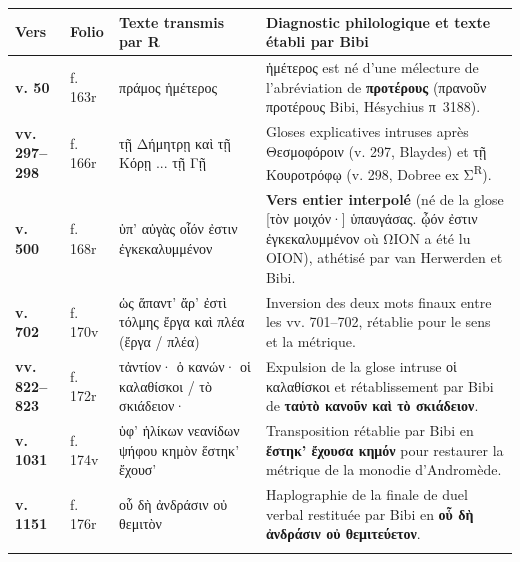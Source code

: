 \documentclass[11pt, a4paper, twoside]{article}
\renewcommand{\_}{\origunderscore\penalty0\relax}
\renewcommand{\texttt}[1]{#1}
\newcommand{\R}{\textbf{R}}
\newcommand{\Bibi}{\textit{Bibi}}
\def\R{R}%
\def\Bibi{Bibi}%
\begin{document}
{\small
\begin{longtable}{@{}>{\raggedright\arraybackslash}p{} >{\raggedright\arraybackslash}p{} >{\raggedright\arraybackslash}p{} >{\raggedright\arraybackslash}p{}@{}}
\toprule
\textbf{Vers} & \textbf{Folio} & \textbf{Texte transmis par \R{}} & \textbf{Diagnostic philologique et texte établi par \Bibi{}} \\
\midrule
\endhead
\bottomrule
\endfoot
\textbf{v. 50} & \texttt{f. 163r} & \texttt{πράμος ἡμέτερος} & \texttt{ἡμέτερος} est né d'une mélecture de l'abréviation de \textbf{\texttt{προτέρους}} (\texttt{πρανοῦν προτέρους} \Bibi{}, Hésychius π~3188). \\
\addlinespace[3pt]
\textbf{vv. 297–298} & \texttt{f. 166r} & \texttt{τῇ Δήμητρῃ καὶ τῇ Κόρῃ ... τῇ Γῇ} & Gloses explicatives intruses après \texttt{Θεσμοφόροιν} (v. 297, Blaydes) et \texttt{τῇ Κουροτρόφῳ} (v. 298, Dobree ex Σ\textsuperscript{R}). \\
\addlinespace[3pt]
\textbf{v. 500} & \texttt{f. 168r} & \texttt{ὑπ' αὐγὰς οἷόν ἐστιν ἐγκεκαλυμμένον} & \textbf{Vers entier interpolé} (né de la glose \texttt{[τὸν μοιχόν·] ὑπαυγάσας. ᾦόν ἐστιν ἐγκεκαλυμμένον} où \texttt{ΩΙΟΝ} a été lu \texttt{ΟΙΟΝ}), athétisé par van Herwerden et \Bibi{}. \\
\addlinespace[3pt]
\textbf{v. 702} & \texttt{f. 170v} & \texttt{ὡς ἅπαντ' ἄρ' ἐστὶ τόλμης ἔργα καὶ πλέα} (\texttt{ἔργα} / \texttt{πλέα}) & Inversion des deux mots finaux entre les vv. 701–702, rétablie pour le sens et la métrique. \\
\addlinespace[3pt]
\textbf{vv. 822–823} & \texttt{f. 172r} & \texttt{τἀντίον· ὁ κανών· οἱ καλαθίσκοι / τὸ σκιάδειον·} & Expulsion de la glose intruse \texttt{οἱ καλαθίσκοι} et rétablissement par \Bibi{} de \textbf{\texttt{ταὐτὸ κανοῦν καὶ τὸ σκιάδειον}}. \\
\addlinespace[3pt]
\textbf{v. 1031} & \texttt{f. 174v} & \texttt{ὑφ' ἡλίκων νεανίδων ψήφου κημὸν ἕστηκ' ἔχουσ'} & Transposition rétablie par \Bibi{} en \textbf{\texttt{ἕστηκ' ἔχουσα κημόν}} pour restaurer la métrique de la monodie d'Andromède. \\
\addlinespace[3pt]
\textbf{v. 1151} & \texttt{f. 176r} & \texttt{οὗ δὴ ἀνδράσιν οὐ θεμιτὸν} & Haplographie de la finale de duel verbal restituée par \Bibi{} en \textbf{\texttt{οὗ δὴ ἀνδράσιν οὐ θεμιτεύετον}}. \\
\addlinespace[3pt]
\end{longtable}
}
\end{document}
